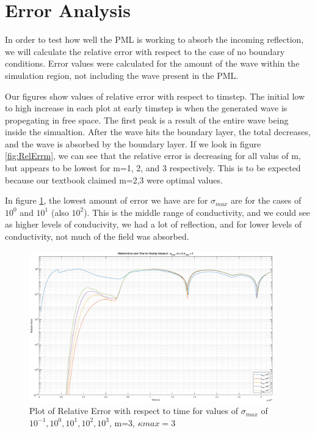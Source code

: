 \documentclass{article}
\begin{document}
\section{Error Analysis}
In order to test how well the PML is working to absorb the incoming reflection,
we will calculate the relative error with respect to the case of no boundary
conditions. Error values were calculated for the amount of the wave within the
simulation region, not including the wave present in the PML.  

Our figures show values of relative error with respect to timstep. The initial
low to high increase in each plot at early timstep is when the generated wave is
propegating in free space. The first peak is a result of the entire wave being
inside the simualtion. After the wave hits the boundary layer, the total
decreases, and the wave is absorbed by the boundary layer. If we look in figure
\ref{fig:RelErrm}, we can see that the relative error is decreasing for
all valus of m, but appears to be lowest for m=1, 2, and 3 respectively. This is
to be expected because our textbook claimed m=2,3 were optimal values.

In figure \ref{fig:RelErrSigmaxm3}, the lowest amount of error we have are for
$\sigma_{max}$ are for the cases of$ 10^0$ and $ 10^1$ (also $10^2$). This is the middle range of
conductivity, and we could see as higher levels of conducivity, we had a lot of
reflection, and for lower levels of conductivity, not much of the field was absorbed.

\begin{figure}
  \centering
  \includegraphics[width=400]{Rel_Err_SigMax_m3}
  \caption{Plot of Relative Error with respect to time for values of
    $\sigma_{max}$ of $10^{-1}, 10^0, 10^1, 10^2, 10^3$, m=3, $\kappa{max}=3$}\label{fig:RelErrSigmaxm3}
\end{figure}
\end{document}
